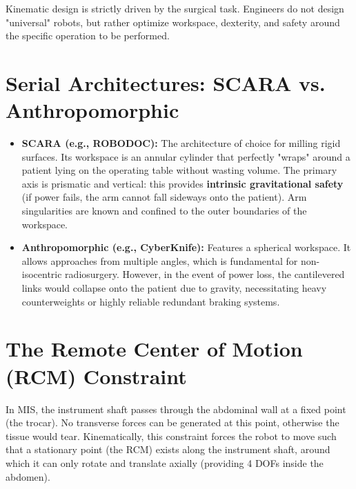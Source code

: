 \documentclass[11pt,a4paper,twoside]{report}
\begin{document}
Kinematic design is strictly driven by the surgical task. Engineers do not design "universal" robots, but rather optimize workspace, dexterity, and safety around the specific operation to be performed.

\section{Serial Architectures: SCARA vs. Anthropomorphic}
\begin{itemize}
    \item \textbf{SCARA (e.g., ROBODOC):} The architecture of choice for milling rigid surfaces. Its workspace is an annular cylinder that perfectly "wraps" around a patient lying on the operating table without wasting volume. The primary axis is prismatic and vertical: this provides \textbf{intrinsic gravitational safety} (if power fails, the arm cannot fall sideways onto the patient). Arm singularities are known and confined to the outer boundaries of the workspace.
    \item \textbf{Anthropomorphic (e.g., CyberKnife):} Features a spherical workspace. It allows approaches from multiple angles, which is fundamental for non-isocentric radiosurgery. However, in the event of power loss, the cantilevered links would collapse onto the patient due to gravity, necessitating heavy counterweights or highly reliable redundant braking systems.
\end{itemize}

\section{The Remote Center of Motion (RCM) Constraint}
In MIS, the instrument shaft passes through the abdominal wall at a fixed point (the trocar). No transverse forces can be generated at this point, otherwise the tissue would tear. Kinematically, this constraint forces the robot to move such that a stationary point (the RCM) exists along the instrument shaft, around which it can only rotate and translate axially (providing 4 DOFs inside the abdomen).
\end{document}
